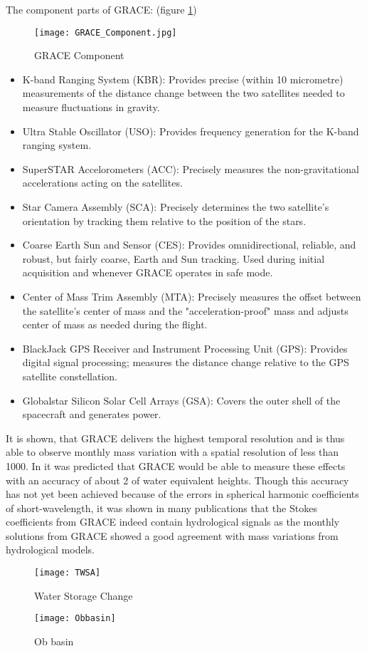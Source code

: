 The component parts of GRACE: (figure \ref{fig:GRACEComponent}) \cite{gracecomponent}
\begin{figure}[htbp]
	\centering
	\texttt{[image: GRACE\_Component.jpg]} 
	\caption{GRACE Component} 
	\label{fig:GRACEComponent}
\end{figure}
\begin{itemize}
	\item K-band Ranging System (KBR): Provides precise (within 10 micrometre) measurements of the distance change between the two satellites needed to measure fluctuations in gravity.
	\item Ultra Stable Oscillator (USO): Provides frequency generation for the K-band ranging system.
	\item SuperSTAR Accelorometers (ACC): Precisely measures the non-gravitational accelerations acting on the satellites.
	\item Star Camera Assembly (SCA): Precisely determines the two satellite's orientation by tracking them relative to the position of the stars.
	\item Coarse Earth Sun and Sensor (CES): Provides omnidirectional, reliable, and robust, but fairly coarse, Earth and Sun tracking. Used during initial acquisition and whenever GRACE operates in safe mode.
	\item Center of Mass Trim Assembly (MTA): Precisely measures the offset between the satellite's center of mass and the "acceleration-proof" mass and adjusts center of mass as needed during the flight.
	\item BlackJack GPS Receiver and Instrument Processing Unit (GPS): 	Provides digital signal processing; measures the distance change relative to the GPS satellite constellation.
	\item Globalstar Silicon Solar Cell Arrays (GSA): Covers the outer shell of the spacecraft and generates power.
\end{itemize}
It is shown, that GRACE delivers the highest temporal resolution and is thus able to observe monthly mass variation with a spatial resolution of less than 1000. In \cite{wahr1998time} it was predicted that GRACE would be able to measure these effects with an accuracy of about 2 of water equivalent heights. Though this accuracy has not yet been achieved because of the errors in spherical harmonic coefficients of short-wavelength, it was shown in many publications that the Stokes coefficients from GRACE indeed contain hydrological signals as the monthly solutions from GRACE showed a good agreement with mass variations from hydrological models.
\begin{figure}[htbp]
	\centering
	\texttt{[image: TWSA]} %
	\caption{Water Storage Change} 
	\label{fig:TWSA}
\end{figure}
\begin{figure}[ht]
	\centering
	\texttt{[image: Obbasin]} %
	\caption{Ob basin} 
	\label{fig:Obbasin}
\end{figure}
